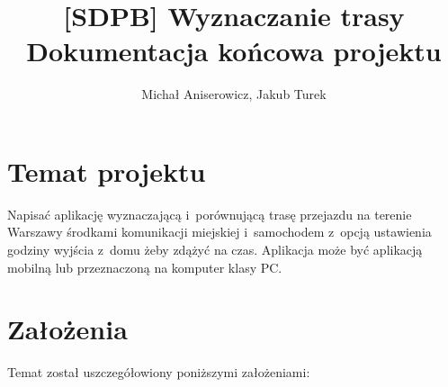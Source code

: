 \documentclass[a4paper,12pt]{article}
\title{\LARGE{[SDPB] Wyznaczanie trasy} \\ \vspace{2mm} \large{Dokumentacja końcowa projektu}}
\author{Michał Aniserowicz, Jakub Turek}
\date{}
\begin{document}
	\maketitle

	\section*{Temat projektu}

	Napisać aplikację wyznaczającą i~porównującą trasę przejazdu na terenie Warszawy środkami komunikacji miejskiej i~samochodem z~opcją ustawienia godziny wyjścia z~domu żeby zdążyć na czas. Aplikacja może być aplikacją mobilną lub przeznaczoną na komputer klasy PC.

	\section*{Założenia}

	Temat został uszczegółowiony poniższymi założeniami:
\end{document}
